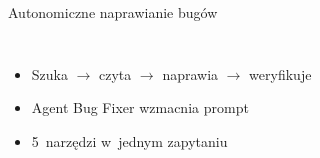 \documentclass[aspectratio=169]{beamer}
\begin{document}
\begin{frame}{Autonomiczne naprawianie bug\'ow}
\begin{columns}[T]
        \vspace{0.15cm}
        \begin{itemize}\setlength{\itemsep}{0pt}\footnotesize
            \item Szuka $\rightarrow$ czyta $\rightarrow$ naprawia $\rightarrow$ weryfikuje
            \item Agent Bug Fixer wzmacnia prompt
            \item 5~narz\k{e}dzi w~jednym zapytaniu
        \end{itemize}
    \end{columns}
\end{frame}

\end{document}
